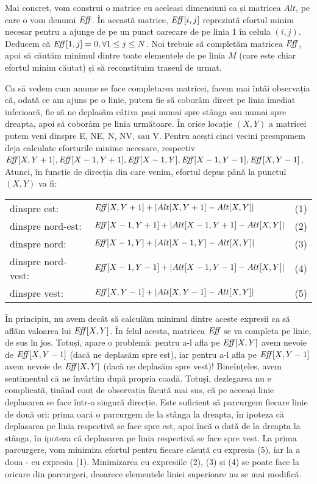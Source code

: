 Mai concret, vom construi o matrice cu aceleași dimensiuni ca și matricea
$Alt$, pe care o vom denumi $\mathit{Eff}$. În această matrice, $\mathit{Eff}[i,j]$ reprezintă
efortul minim necesar pentru a ajunge de pe un punct oarecare de pe linia 1 în
celula $(i, j)$. Deducem că $\mathit{Eff}[1,j] = 0, \forall 1 \leq j \leq N$. Noi
trebuie să completăm matricea $\mathit{Eff}$, apoi să căutăm minimul dintre toate
elementele de pe linia $M$ (care este chiar efortul minim căutat) și să
reconstituim traseul de urmat.

Ca să vedem cum anume se face completarea matricei, facem mai întâi observația
că, odată ce am ajuns pe o linie, putem fie să coborâm direct pe linia imediat
inferioară, fie să ne deplasăm câțiva pași numai spre stânga sau numai spre
dreapta, apoi să coborâm pe linia următoare. În orice locație $(X,Y)$ a
matricei putem veni dinspre E, NE, N, NV, sau V. Pentru acești cinci vecini
presupunem deja calculate eforturile minime necesare, respectiv $\mathit{Eff}[X,Y+1],
\mathit{Eff}[X-1,Y+1], \mathit{Eff}[X-1,Y], \mathit{Eff}[X-1,Y-1], \mathit{Eff}[X,Y-1]$. Atunci, în funcție de
direcția din care venim, efortul depus până la punctul $(X,Y)$ va fi:

\begin{tabular}{lll}
  dinspre est:       & $\mathit{Eff}[X,Y+1]+ |Alt[X,Y+1] - Alt[X,Y]|$     & (1) \\
  dinspre nord-est:  & $\mathit{Eff}[X-1,Y+1]+ |Alt[X-1,Y+1] - Alt[X,Y]|$ & (2) \\
  dinspre nord:      & $\mathit{Eff}[X-1,Y]+ |Alt[X-1,Y] - Alt[X,Y]|$     & (3) \\
  dinspre nord-vest: & $\mathit{Eff}[X-1,Y-1]+ |Alt[X-1,Y-1] - Alt[X,Y]|$ & (4) \\
  dinspre vest:      & $\mathit{Eff}[X,Y-1]+ |Alt[X,Y-1] - Alt[X,Y]|$     & (5) \\
\end{tabular}

În principiu, nu avem decât să calculăm minimul dintre aceste expresii ca să
aflăm valoarea lui $\mathit{Eff}[X,Y]$. În felul acesta, matricea $\mathit{Eff}$ se va completa
pe linie, de sus în jos. Totuși, apare o problemă: pentru a-l afla pe
$\mathit{Eff}[X,Y]$ avem nevoie de $\mathit{Eff}[X,Y-1]$ (dacă ne deplasăm spre est), iar pentru
a-l afla pe $\mathit{Eff}[X,Y-1]$ avem nevoie de $\mathit{Eff}[X,Y]$ (dacă ne deplasăm spre
vest)! Bineînțeles, avem sentimentul că ne învârtim după propria
coadă. Totuși, dezlegarea nu e complicată, ținând cont de observația făcută
mai sus, că pe aceeași linie deplasarea se face într-o singură direcție. Este
suficient să parcurgem fiecare linie de două ori: prima oară o parcurgem de la
stânga la dreapta, în ipoteza că deplasarea pe linia respectivă se face spre
est, apoi încă o dată de la dreapta la stânga, în ipoteza că deplasarea pe
linia respectivă se face spre vest. La prima parcurgere, vom minimiza efortul
pentru fiecare căsuță cu expresia (5), iar la a doua - cu expresia
(1). Minimizarea cu expresiile (2), (3) și (4) se poate face la oricare din
parcurgeri, deoarece elementele liniei superioare nu se mai modifică.


